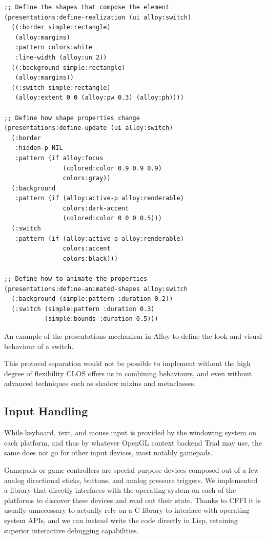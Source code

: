 \documentclass[format=sigconf]{acmart}
\begin{document}
\begin{listing}
\begin{verbatim}
;; Define the shapes that compose the element
(presentations:define-realization (ui alloy:switch)
  ((:border simple:rectangle)
   (alloy:margins)
   :pattern colors:white
   :line-width (alloy:un 2))
  ((:background simple:rectangle)
   (alloy:margins))
  ((:switch simple:rectangle)
   (alloy:extent 0 0 (alloy:pw 0.3) (alloy:ph))))

;; Define how shape properties change
(presentations:define-update (ui alloy:switch)
  (:border
   :hidden-p NIL
   :pattern (if alloy:focus
                (colored:color 0.9 0.9 0.9)
                colors:gray))
  (:background
   :pattern (if (alloy:active-p alloy:renderable)
                colors:dark-accent
                (colored:color 0 0 0 0.5)))
  (:switch
   :pattern (if (alloy:active-p alloy:renderable)
                colors:accent
                colors:black)))

;; Define how to animate the properties
(presentations:define-animated-shapes alloy:switch
  (:background (simple:pattern :duration 0.2))
  (:switch (simple:pattern :duration 0.3)
           (simple:bounds :duration 0.5)))
\end{verbatim}
\caption{An example of the presentations mechanism in Alloy to define the look and visual behaviour of a switch.}
\label{lst:presentation}
\end{listing}

This protocol separation would not be possible to implement without the high degree of flexibility CLOS offers us in combining behaviours, and even without advanced techniques such as shadow mixins and metaclasses.

\subsection{Input Handling}\label{input}
While keyboard, text, and mouse input is provided by the windowing system on each platform, and thus by whatever OpenGL context backend Trial may use, the same does not go for other input devices, most notably gamepads.

Gamepads or game controllers are special purpose devices composed out of a few analog directional sticks, buttons, and analog pressure triggers. We implemented a library that directly interfaces with the operating system on each of the platforms to discover these devices and read out their state. Thanks to CFFI it is usually unnecessary to actually rely on a C library to interface with operating system APIs, and we can instead write the code directly in Lisp, retaining superior interactive debugging capabilities.
\end{document}
